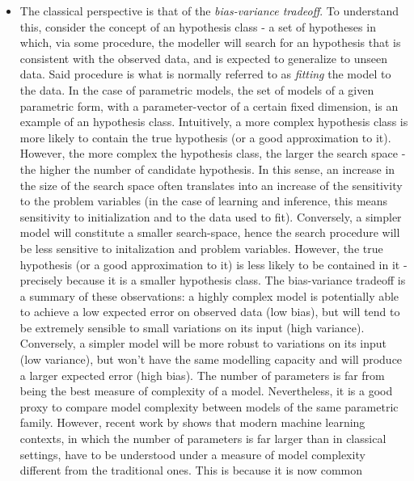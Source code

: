 \begin{itemize}
    \item The classical perspective is that of the \emph{bias-variance tradeoff}. To
        understand this, consider the concept of an hypothesis class - a set
        of hypotheses in which, via some procedure, the modeller will search
        for an hypothesis that is consistent with the observed data, and is
        expected to generalize to unseen data. Said procedure is what is normally
        referred to as \emph{fitting} the model to the data. In the case of
        parametric models, the set of models of a given parametric form, with
        a parameter-vector of a certain fixed dimension, is an example of an hypothesis
        class. Intuitively, a more complex hypothesis class is more likely to
        contain the true hypothesis (or a good approximation to it). However,
        the more complex the hypothesis class, the larger the search space -
        the higher the number of candidate hypothesis. In this sense, an increase
        in the size of the search space often translates into an increase of the
        sensitivity to the problem variables (in the case of learning and inference,
        this means sensitivity to initialization and to the data used to fit).
        Conversely, a simpler model will constitute a smaller search-space, hence
        the search procedure will be less sensitive to initalization and problem
        variables. However, the true hypothesis (or a good approximation to it)
        is less likely to be contained in it - precisely because it is a smaller
        hypothesis class. The bias-variance tradeoff is a summary of these observations:
        a highly complex model is potentially able to achieve a low expected error
        on observed data (low bias), but will tend to be extremely sensible to small
        variations on its input (high variance). Conversely, a simpler model will
        be more robust to variations on its input (low variance), but won't have the same
        modelling capacity and will produce a larger expected error (high bias).
        The number of parameters is far from being the best measure of complexity
        of a model. Nevertheless, it is a good proxy to compare model complexity
        between models of the same parametric family. However, recent work by
        \textcite{Belkin2018Dec} shows that modern machine learning
        contexts, in which the number of parameters is far larger than in classical
        settings, have to be understood under a measure of model complexity
        different from the traditional ones. This is because it is now common

\end{itemize}
